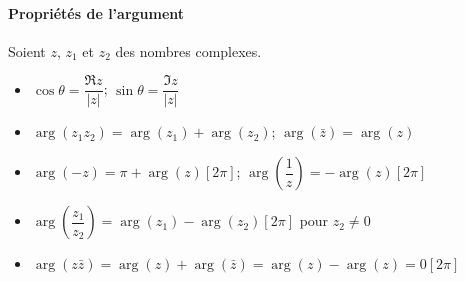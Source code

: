 \paragraph{Propriétés de l'argument}
Soient $z$, $z_1$ et $z_2$ des nombres complexes.
\begin{itemize}
    \item $\cos\theta=\dfrac{\Re{z}}{|z|}$; $\sin\theta=\dfrac{\Im{z}}{|z|}$
    \item $\arg(z_1z_2)=\arg(z_1)+\arg(z_2)$; $\arg(\bar{z})=\arg(z)$
    \item $\arg(-z)=\pi+\arg(z)[2\pi]$; 
          $\arg\left(\dfrac{1}{z}\right)=-\arg(z)[2\pi]$
    \item $\arg\left(\dfrac{z_1}{z_2}\right)=\arg(z_1)-\arg(z_2)[2\pi]$ 
          pour $z_2\neq0$
    \item $\arg(z\bar{z})=\arg(z)+\arg(\bar{z})=\arg(z)-\arg(z)=0[2\pi]$
\end{itemize}
